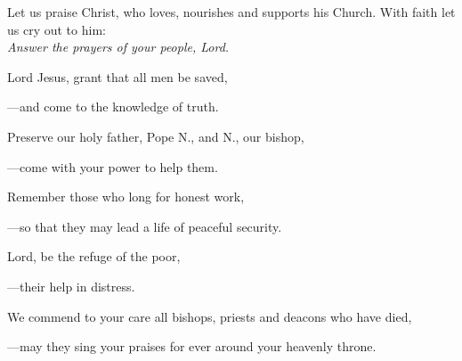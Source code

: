 \intercessions\indent

\begin{hangpar}

Let us praise Christ, who loves, nourishes and supports his Church. With faith let us cry out to him:\\
\emph{Answer the prayers of your people, Lord.}

\medskip Lord Jesus, grant that all men be saved,

{\color{red}---\thinspace}and come to the knowledge of truth.

\medskip Preserve our holy father, Pope N., and N., our bishop,

{\color{red}---\thinspace}come with your power to help them.

\medskip Remember those who long for honest work,

{\color{red}---\thinspace}so that they may lead a life of peaceful security.

\medskip Lord, be the refuge of the poor,

{\color{red}---\thinspace}their help in distress.

\medskip We commend to your care all bishops, priests and deacons who have died,

{\color{red}---\thinspace}may they sing your praises for ever around your heavenly throne.

\end{hangpar}

